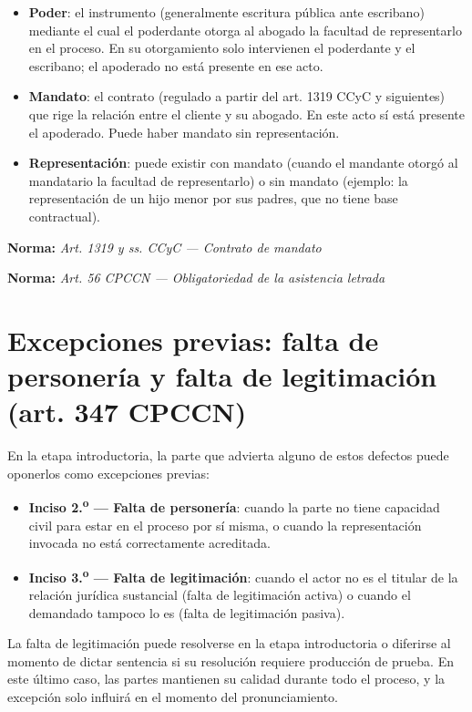 \documentclass[12pt,oneside]{book}
\newcommand{\norma}[1]{%
\par\noindent\textbf{Norma:} \textit{#1}\par\smallskip
}
\begin{document}
\begin{itemize}
    \item \textbf{Poder}: el instrumento (generalmente escritura pública ante escribano) mediante el cual el poderdante otorga al abogado la facultad de representarlo en el proceso. En su otorgamiento solo intervienen el poderdante y el escribano; el apoderado no está presente en ese acto.
    \item \textbf{Mandato}: el contrato (regulado a partir del art. 1319 CCyC y siguientes) que rige la relación entre el cliente y su abogado. En este acto sí está presente el apoderado. Puede haber mandato sin representación.
    \item \textbf{Representación}: puede existir con mandato (cuando el mandante otorgó al mandatario la facultad de representarlo) o sin mandato (ejemplo: la representación de un hijo menor por sus padres, que no tiene base contractual).
\end{itemize}

\norma{Art. 1319 y ss. CCyC --- Contrato de mandato}
\norma{Art. 56 CPCCN --- Obligatoriedad de la asistencia letrada}

\section{Excepciones previas: falta de personería y falta de legitimación (art. 347 CPCCN)}

En la etapa introductoria, la parte que advierta alguno de estos defectos puede oponerlos como excepciones previas:

\begin{itemize}
    \item \textbf{Inciso 2.\textsuperscript{o} — Falta de personería}: cuando la parte no tiene capacidad civil para estar en el proceso por sí misma, o cuando la representación invocada no está correctamente acreditada.
    \item \textbf{Inciso 3.\textsuperscript{o} — Falta de legitimación}: cuando el actor no es el titular de la relación jurídica sustancial (falta de legitimación activa) o cuando el demandado tampoco lo es (falta de legitimación pasiva).
\end{itemize}

La falta de legitimación puede resolverse en la etapa introductoria o diferirse al momento de dictar sentencia si su resolución requiere producción de prueba. En este último caso, las partes mantienen su calidad durante todo el proceso, y la excepción solo influirá en el momento del pronunciamiento.
\end{document}
